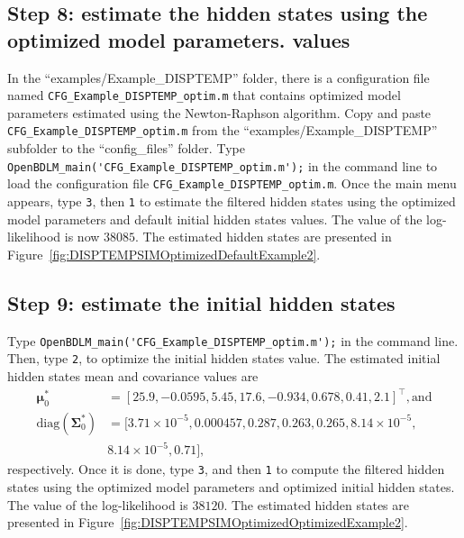\subsection{Step 8: estimate the hidden states using the optimized model parameters. values}

In the ``examples/Example\_DISPTEMP'' folder, there is a configuration file named \lstinline[basicstyle = \mlttfamily \small, backgroundcolor = \color{light-gray}]!CFG_Example_DISPTEMP_optim.m! that contains optimized model parameters estimated using the Newton-Raphson algorithm.
Copy and paste \lstinline[basicstyle = \mlttfamily \small, backgroundcolor = \color{light-gray}]!CFG_Example_DISPTEMP_optim.m! from  the ``examples/Example\_DISPTEMP'' subfolder  to the ``config\_files'' folder.
Type \colorbox{light-gray}{\lstinline[basicstyle = \mlttfamily \small, backgroundcolor = \color{light-gray}]!OpenBDLM_main('CFG_Example_DISPTEMP_optim.m');!} in the \MATLAB{} command line to load the configuration file  \lstinline[basicstyle = \mlttfamily \small, backgroundcolor = \color{light-gray}]!CFG_Example_DISPTEMP_optim.m!.
Once the main menu appears, type  \colorbox{light-gray}{\lstinline[basicstyle = \mlttfamily \small, backgroundcolor = \color{light-gray}]!3!}, then \colorbox{light-gray}{\lstinline[basicstyle = \mlttfamily \small, backgroundcolor = \color{light-gray}]!1!} to estimate the filtered hidden states using the optimized model parameters and default initial hidden states values.
The value of the log-likelihood is now $38085$.
The estimated hidden states are presented in Figure~\ref{fig:DISPTEMPSIMOptimizedDefaultExample2}.

\subsection{Step 9: estimate the initial hidden states}

Type \colorbox{light-gray}{\lstinline[basicstyle = \mlttfamily \small, backgroundcolor = \color{light-gray}]!OpenBDLM_main('CFG_Example_DISPTEMP_optim.m');!} in the \MATLAB{} command line.
Then, type  \colorbox{light-gray}{\lstinline[basicstyle = \mlttfamily \small, backgroundcolor = \color{light-gray}]!2!}, to optimize the initial hidden states value.
The estimated initial hidden states mean and covariance values are 
\begin{align*}
\bm \mu^{*}_{0} & = [	 25.9  ,	-0.0595	, 5.45  	, 17.6  ,	-0.934	, 0.678 ,	0.41  ,	2.1]^{\intercal}, \text{and} \\
 \text{diag}(\bm\Sigma^{*}_{0}) & = [	3.71\times10^{-5},	0.000457	, 0.287 	, 0.263 ,	0.265 	,8.14\times10^{-5}	, \\
 & 8.14\times10^{-5}	, 0.71    ], 
 \end{align*}
 respectively.
Once it is done, type  \colorbox{light-gray}{\lstinline[basicstyle = \mlttfamily \small, backgroundcolor = \color{light-gray}]!3!}, and then  \colorbox{light-gray}{\lstinline[basicstyle = \mlttfamily \small, backgroundcolor = \color{light-gray}]!1!} to compute the filtered hidden states using the optimized model parameters and optimized initial hidden states.
The value of the log-likelihood is $38120$.
The estimated hidden states are presented in Figure~\ref{fig:DISPTEMPSIMOptimizedOptimizedExample2}.


